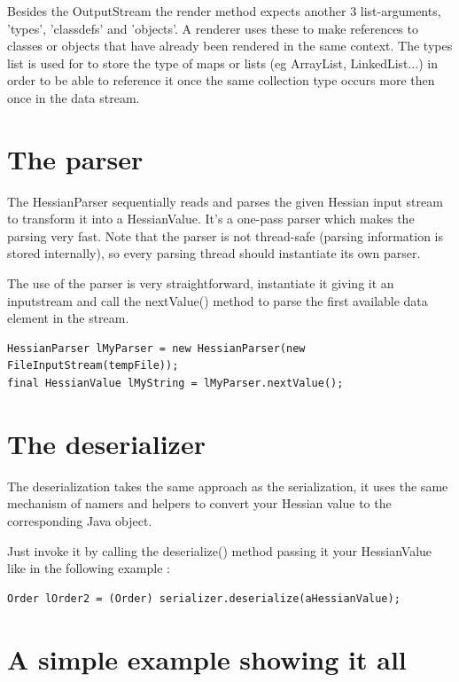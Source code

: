 \documentclass[a4paper]{article}
\begin{document}
Besides the OutputStream the render method expects another 3 list-arguments, 'types', 'classdefs' and 'objects'. A renderer uses these to make references to classes or objects that have already been rendered in the same context. The types list is used for to store the type of maps or lists (eg ArrayList, LinkedList...) in order to be able to reference it once the same collection type occurs more then once in the data stream.

\section{The parser}

The HessianParser sequentially reads and parses the given Hessian input stream to transform it into a HessianValue. It's a one-pass parser which makes the parsing very fast.  Note that the parser is not thread-safe (parsing information is stored internally), so every parsing thread should instantiate its own parser.

The use of the parser is very straightforward, instantiate it giving it an inputstream and call the nextValue() method to parse the first available data element in the stream. 

\medskip
\begin{lstlisting}
HessianParser lMyParser = new HessianParser(new FileInputStream(tempFile));
final HessianValue lMyString = lMyParser.nextValue();
\end{lstlisting}
\medskip

\section{The deserializer}

The deserialization takes the same approach as the serialization, it uses the same mechanism of namers and helpers to convert your Hessian value to the corresponding Java object.

Just invoke it by calling the deserialize() method passing it your HessianValue like in the following example :

\medskip
\begin{lstlisting}
Order lOrder2 = (Order) serializer.deserialize(aHessianValue);
\end{lstlisting}
\medskip

\section{A simple example showing it all}
\end{document}
